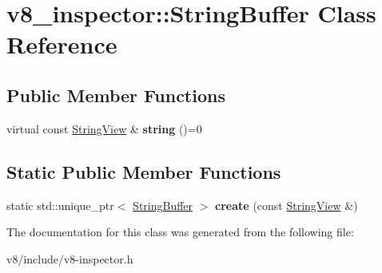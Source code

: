 \hypertarget{classv8__inspector_1_1StringBuffer}{}\section{v8\+\_\+inspector\+:\+:String\+Buffer Class Reference}
\label{classv8__inspector_1_1StringBuffer}
\subsection*{Public Member Functions}
\begin{DoxyCompactItemize}
\item 
\mbox{\label{classv8__inspector_1_1StringBuffer_a72806809fe0fc2d2ad3f52fe934e9e07}} 
virtual const \mbox{\hyperlink{classv8__inspector_1_1StringView}{String\+View}} \& {\bfseries string} ()=0
\end{DoxyCompactItemize}
\subsection*{Static Public Member Functions}
\begin{DoxyCompactItemize}
\item 
\mbox{\label{classv8__inspector_1_1StringBuffer_a1c067f19a39fb3ee3a5c3b9107fbb5da}} 
static std\+::unique\+\_\+ptr$<$ \mbox{\hyperlink{classv8__inspector_1_1StringBuffer}{String\+Buffer}} $>$ {\bfseries create} (const \mbox{\hyperlink{classv8__inspector_1_1StringView}{String\+View}} \&)
\end{DoxyCompactItemize}


The documentation for this class was generated from the following file\+:\begin{DoxyCompactItemize}
\item 
v8/include/v8-\/inspector.\+h\end{DoxyCompactItemize}
